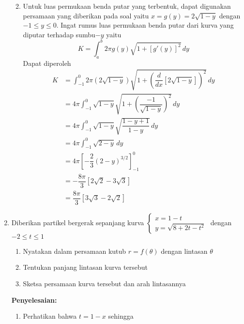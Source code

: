 \documentclass{article}
\begin{document}
\begin{enumerate}
\begin{enumerate}
		\begin{center}
	\end{center}
	\item Untuk luas permukaan benda putar yang terbentuk, dapat digunakan persamaan yang diberikan pada soal yaitu $x=g(y)=2\sqrt{1-y}$ dengan $-1\leq y\leq 0$. Ingat rumus luas permukaan benda putar dari kurva yang diputar terhadap sumbu$-y$ yaitu
	$$ K= \int_a^b 2\pi g(y)\sqrt{1+[g'(y)]^2}\, dy $$
	Dapat diperoleh 
	\begin{align*}
	K &= \int_{-1}^0 2\pi (2\sqrt{1-y})\sqrt{1+\left(\dfrac{d}{dx}\left[2\sqrt{1-y}\right]\right)^2} \, dy\\
	&= 4\pi \int_{-1}^0 \sqrt{1-y}\sqrt{1+\left(\dfrac{-1}{\sqrt{1-y}}\right)^2}\, dy\\
	&= 4\pi \int_{-1}^0 \sqrt{1-y}\sqrt{\dfrac{1-y+1}{1-y}}\, dy\\
	&= 4\pi \int_{-1}^0 \sqrt{2-y}\, dy\\
	&= 4\pi \left[-\dfrac{2}{3}(2-y)^{3/2}\right]^0_{-1}\\
	&= -\dfrac{8\pi}{3}\left[2\sqrt{2}-3\sqrt{3}\right]\\
	&= \dfrac{8\pi}{3}\left[3\sqrt{3}-2\sqrt{2}\right]
	\end{align*}
	\end{enumerate}
	\item Diberikan partikel bergerak sepanjang kurva $\begin{cases}x=1-t\\ y=\sqrt{8+2t-t^2}\end{cases}$ dengan $-2\leq t\leq 1$
	\begin{enumerate}
		\item Nyatakan dalam persamaan kutub $r=f(\theta)$ dengan lintasan $\theta$
		\item Tentukan panjang lintasan kurva tersebut
		\item Sketsa persamaan kurva tersebut dan arah lintasannya 
	\end{enumerate}
	\textbf{Penyelesaian:}
	\begin{enumerate}
		\item Perhatikan bahwa $t=1-x$ sehingga

\end{enumerate}
\end{enumerate}
\end{document}
